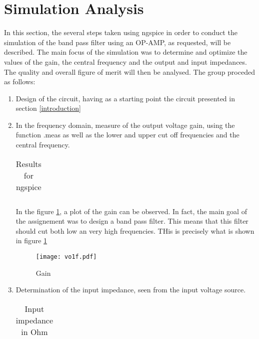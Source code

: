 \section{Simulation Analysis}
\label{section:sim}
 
In this section, the several steps taken using ngspice in order to conduct the simulation of the band pass filter using an OP-AMP, as requested, will be described. The main focus of the simulation was to determine and optimize the values of the gain, the central frequency and the output and input impedances. The quality and overall figure of merit will then be analysed.
The group proceded as follows:

\begin{enumerate}
\item Design of the circuit, having as a starting point the circuit presented in section \ref{introduction}

  
\item  In the frequency domain, measure of the output voltage gain, using the function .meas as well as the lower and upper cut off frequencies and the central frequency.


\begin{table}[ht]
  \centering
  \begin{tabular}{|l|r|}
    \hline    
   
    \end{tabular}
  \caption{Results for ngspice}
    \label{tab:results}
\end{table}



In the figure \ref{fig:gain}, a plot of the gain can be observed. In fact, the main goal of the assignement was to design a band pass filter. This means that this filter should cut both low an very high frequencies. THis is precisely what is shown in figure \ref{fig:gain}



\begin{figure}[ht]
\centering
  \texttt{[image: vo1f.pdf]}
  \caption{Gain}
  \label{fig:gain}
\end{figure}



\item Determination of the input impedance, seen from the input voltage source.

\begin{table}[h]
  \centering
  \begin{tabular}{|l|r|}
    \hline    
   
   \end{tabular}
  \caption{Input impedance in Ohm}
    \label{tab:ZI}
\end{table}


\end{enumerate}
